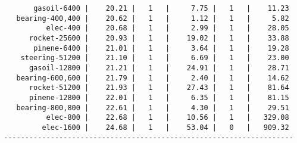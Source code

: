\begin{lstlisting}
       gasoil-6400 |    20.21 |   1   |     7.75 |   1   |    11.23
   bearing-400,400 |    20.62 |   1   |     1.12 |   1   |     5.82
          elec-400 |    20.68 |   1   |     2.99 |   1   |    28.05
      rocket-25600 |    20.93 |   1   |    19.02 |   1   |    33.88
       pinene-6400 |    21.01 |   1   |     3.64 |   1   |    19.28
    steering-51200 |    21.10 |   1   |     6.69 |   1   |    23.00
      gasoil-12800 |    21.21 |   1   |    24.91 |   1   |    28.71
   bearing-600,600 |    21.79 |   1   |     2.40 |   1   |    14.62
      rocket-51200 |    21.93 |   1   |    27.43 |   1   |    81.64
      pinene-12800 |    22.01 |   1   |     6.35 |   1   |    81.15
   bearing-800,800 |    22.61 |   1   |     4.30 |   1   |    29.51
          elec-800 |    22.68 |   1   |    10.56 |   1   |   329.08
         elec-1600 |    24.68 |   1   |    53.04 |   0   |   909.32
--------------------------------------------------------------------
\end{lstlisting}
    
